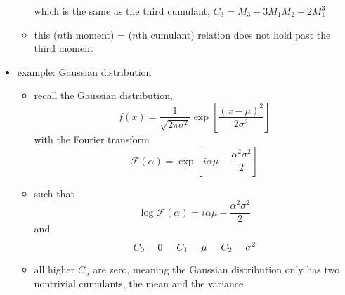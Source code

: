 \documentclass[../jaynes_prob_theory_notes.tex]{subfiles}
\begin{document}
\begin{itemize}
\begin{itemize}
\begin{equation*}
                                \end{equation*}
                                which is the same as the third cumulant, $C_3 = M_3 - 3M_{1}M_{2} + 2M^{3}_{1}$
                            \item this ($n$th moment) = ($n$th cumulant) relation does not hold past the third moment
                        \end{itemize}
                    \item example: Gaussian distribution
                        \begin{itemize}
                            \item recall the Gaussian distribution,
                                \begin{equation*}
                                    f(x) = \frac{1}{\sqrt{2{\pi}{\sigma}^2}} \exp \left[ \frac{{(x-\mu)}^2}{2{\sigma}^2} \right]
                                \end{equation*}
                                with the Fourier transform
                                \begin{equation*}
                                    \mathscr{F}(\alpha) = \exp \left[ i{\alpha}{\mu} - \frac{{\alpha}^{2}{\sigma}^{2}}{2} \right]
                                \end{equation*}
                            \item such that 
                                \begin{equation*}
                                    \log \mathscr{F}(\alpha) = i{\alpha}{\mu} - \frac{{\alpha}^{2}{\sigma}^{2}}{2}
                                \end{equation*}
                                and 
                                \begin{equation*}
                                    C_0 = 0 \hspace{0.5cm} C_1 = \mu \hspace{0.5cm} C_2 = {\sigma}^2
                                \end{equation*}
                            \item all higher $C_n$ are zero, meaning the Gaussian distribution only has two nontrivial cumulants, the mean and the variance
                        \end{itemize}
                \end{itemize}
\end{document}
